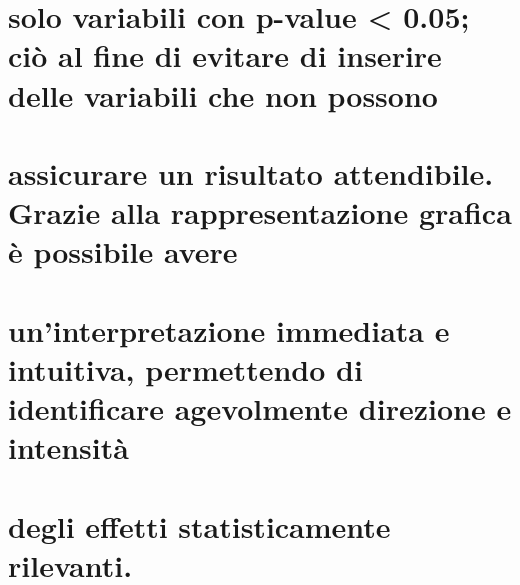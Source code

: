 \documentclass[
]{article}
\begin{document}
\section{solo variabili con p-value \textless{} 0.05; ciò al fine di
evitare di inserire delle variabili che non
possono}\label{solo-variabili-con-p-value-0.05-ciuxf2-al-fine-di-evitare-di-inserire-delle-variabili-che-non-possono}

\section{assicurare un risultato attendibile. Grazie alla
rappresentazione grafica è possibile
avere}\label{assicurare-un-risultato-attendibile.-grazie-alla-rappresentazione-grafica-uxe8-possibile-avere}

\section{un'interpretazione immediata e intuitiva, permettendo di
identificare agevolmente direzione e
intensità}\label{uninterpretazione-immediata-e-intuitiva-permettendo-di-identificare-agevolmente-direzione-e-intensituxe0}

\section{degli effetti statisticamente
rilevanti.}\label{degli-effetti-statisticamente-rilevanti.}
\end{document}
